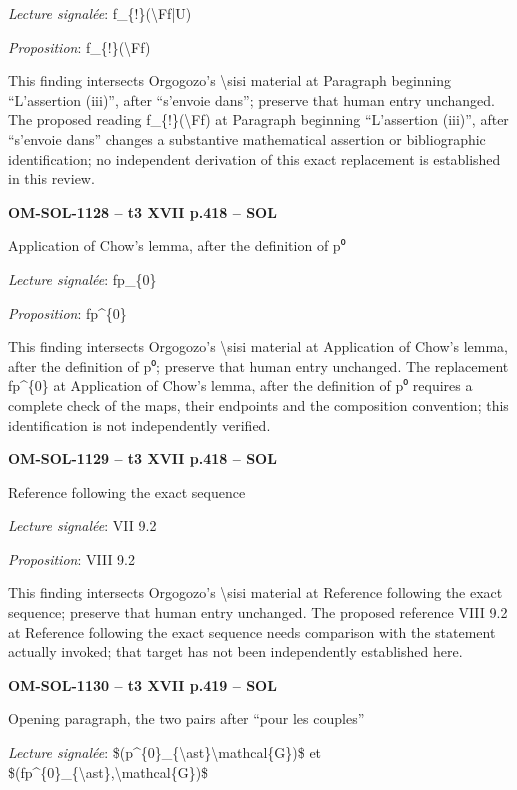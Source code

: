 \emph{Lecture signalée}: f\_\{!\}(\textbackslash{}Ff|U)\par
\emph{Proposition}: f\_\{!\}(\textbackslash{}Ff)\par
This finding intersects Orgogozo's \textbackslash{}sisi material at Paragraph beginning “L'assertion (iii)”, after “s'envoie dans”; preserve that human entry unchanged. The proposed reading f\_\{!\}(\textbackslash{}Ff) at Paragraph beginning “L'assertion (iii)”, after “s'envoie dans” changes a substantive mathematical assertion or bibliographic identification; no independent derivation of this exact replacement is established in this review.\par
\par\noindent\textbf{OM-SOL-1128 -- t3 XVII p.418 -- SOL}\par
Application of Chow's lemma, after the definition of p⁰\par
\emph{Lecture signalée}: fp\_\{0\}\par
\emph{Proposition}: fp\textasciicircum{}\{0\}\par
This finding intersects Orgogozo's \textbackslash{}sisi material at Application of Chow's lemma, after the definition of p⁰; preserve that human entry unchanged. The replacement fp\textasciicircum{}\{0\} at Application of Chow's lemma, after the definition of p⁰ requires a complete check of the maps, their endpoints and the composition convention; this identification is not independently verified.\par
\par\noindent\textbf{OM-SOL-1129 -- t3 XVII p.418 -- SOL}\par
Reference following the exact sequence\par
\emph{Lecture signalée}: VII 9.2\par
\emph{Proposition}: VIII 9.2\par
This finding intersects Orgogozo's \textbackslash{}sisi material at Reference following the exact sequence; preserve that human entry unchanged. The proposed reference VIII 9.2 at Reference following the exact sequence needs comparison with the statement actually invoked; that target has not been independently established here.\par
\par\noindent\textbf{OM-SOL-1130 -- t3 XVII p.419 -- SOL}\par
Opening paragraph, the two pairs after “pour les couples”\par
\emph{Lecture signalée}: \$(p\textasciicircum{}\{0\}\_\{\textbackslash{}ast\}\textbackslash{}mathcal\{G\})\$ et \$(fp\textasciicircum{}\{0\}\_\{\textbackslash{}ast\},\textbackslash{}mathcal\{G\})\$\par
